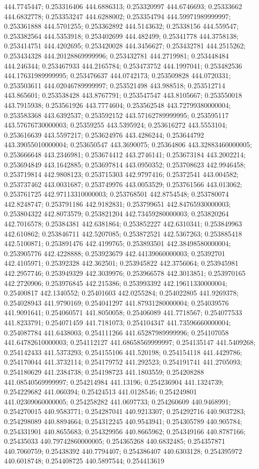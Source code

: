 444.7745447; 0.253316406 444.6886313; 0.253320997 444.6746693; 0.25333662 444.6832778; 0.253353247 444.6288002; 0.253354794 444.59971989999997; 0.253361888 444.5701255; 0.253362892 444.5143632; 0.25338156 444.559547; 0.253382564 444.5353918; 0.253402699 444.482499; 0.25341778 444.3758138; 0.253414751 444.4202695; 0.253420028 444.3456627; 0.253432781 444.2515262; 0.253434328 444.20128869999996; 0.253432781 444.2719981; 0.253448484 444.246344; 0.253467933 444.2165784; 0.253473752 444.1997041; 0.253482536 444.17631989999995; 0.253476637 444.0742173; 0.253509828 444.0720331; 0.253503611 444.02046789999997; 0.253521498 443.988518; 0.253512714 443.865601; 0.253538428 443.8767791; 0.253547547 443.8105667; 0.253550018 443.7915938; 0.253561926 443.7774604; 0.253562548 443.72799380000004; 0.253583368 443.6392537; 0.253592152 443.57162789999995; 0.253595117 443.57676730000003; 0.25359255 443.5395924; 0.253616272 443.5553104; 0.253616639 443.5597217; 0.253624976 443.4286244; 0.253644792 443.39055010000004; 0.253650547 443.3690075; 0.25364806 443.32883460000005; 0.253666648 443.2346981; 0.253674412 443.2746141; 0.253673184 443.2002214; 0.253694849 443.1642885; 0.253697814 443.0950352; 0.253708623 442.9946458; 0.253719814 442.9808123; 0.253715303 442.9797416; 0.25372541 443.004582; 0.253737462 443.0031687; 0.253749976 443.0053529; 0.253761566 443.013062; 0.253761725 442.97113310000003; 0.253768501 442.8754548; 0.253780074 442.8248747; 0.253791186 442.9182831; 0.253799651 442.84765930000003; 0.253804322 442.8073579; 0.253821204 442.73459280000003; 0.253820264 442.7016578; 0.25384381 442.6381864; 0.253852227 442.6310341; 0.253849963 442.610862; 0.253846711 442.5207085; 0.253872521 442.5367263; 0.253885418 442.5100871; 0.253891476 442.4199765; 0.253893501 442.38498580000004; 0.253905776 442.4228888; 0.253923679 442.44139060000003; 0.25392701 442.4105971; 0.25392328 442.362501; 0.253945822 442.3756064; 0.253945981 442.2957746; 0.253949329 442.3039976; 0.253966578 442.3013851; 0.253970165 442.2720906; 0.253976845 442.215386; 0.253993392 442.19611330000004; 0.25400817 442.1340552; 0.25401603 442.0255284; 0.254022805 441.9269378; 0.254028943 441.9790169; 0.254041297 441.87931280000004; 0.254039576 441.9091641; 0.254060571 441.8050058; 0.25406089 441.7718567; 0.254077533 441.8233791; 0.254071459 441.7181073; 0.254104347 441.73596660000004; 0.254087784 441.6438003; 0.254111266 441.65287989999996; 0.254107058 441.64782610000003; 0.254112127 441.68658569999997; 0.254135147 441.5409268; 0.254142433 441.5373293; 0.254155106 441.520198; 0.254154118 441.4429786; 0.254170044 441.3732114; 0.254179752 441.292523; 0.254191741 441.2705093; 0.254180629 441.2384738; 0.254198723 441.1803559; 0.254208288 441.08540569999997; 0.254214984 441.13196; 0.254236904 441.1324739; 0.254229682 441.060394; 0.25424513 441.0128546; 0.254249801 441.02309060000005; 0.254258282 441.0697733; 0.254260609 440.9468991; 0.254270015 440.9583771; 0.254287041 440.9213307; 0.254292716 440.9037283; 0.254298089 440.8894664; 0.254312245 440.9543941; 0.254305789 440.905784; 0.254331901 440.8655683; 0.254329956 440.8665962; 0.254349166 440.8787166; 0.25435033 440.79742860000005; 0.254365268 440.6832485; 0.254357871 440.7060759; 0.25438392 440.7794407; 0.254386407 440.6303128; 0.254395972 440.6018748; 0.254408725 440.5897544; 0.254413619 